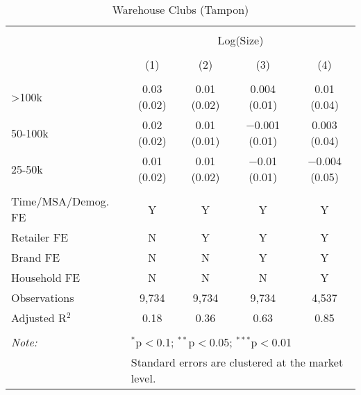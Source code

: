 
\begin{table}[!htbp] \centering 
  \caption{Warehouse Clubs (Tampon)} 
  \label{tab:packageSizeWarehouseTampon} 
\begin{tabular}{@{\extracolsep{5pt}}lcccc} 
\\[-1.8ex]\hline 
\hline \\[-1.8ex] 
 & \multicolumn{4}{c}{Log(Size)} \\ 
\\[-1.8ex] & (1) & (2) & (3) & (4)\\ 
\hline \\[-1.8ex] 
 >100k & 0.03 (0.02) & 0.01 (0.02) & 0.004 (0.01) & 0.01 (0.04) \\ 
  50-100k & 0.02 (0.02) & 0.01 (0.01) & $-$0.001 (0.01) & 0.003 (0.04) \\ 
  25-50k & 0.01 (0.02) & 0.01 (0.02) & $-$0.01 (0.01) & $-$0.004 (0.05) \\ 
 \hline \\[-1.8ex] 
Time/MSA/Demog. FE & Y & Y & Y & Y \\ 
Retailer FE & N & Y & Y & Y \\ 
Brand FE & N & N & Y & Y \\ 
Household FE & N & N & N & Y \\ 
Observations & 9,734 & 9,734 & 9,734 & 4,537 \\ 
Adjusted R$^{2}$ & 0.18 & 0.36 & 0.63 & 0.85 \\ 
\hline 
\hline \\[-1.8ex] 
\textit{Note:}  & \multicolumn{4}{l}{$^{*}$p$<$0.1; $^{**}$p$<$0.05; $^{***}$p$<$0.01} \\ 
 & \multicolumn{4}{l}{Standard errors are clustered at the market level.} \\ 
\end{tabular} 
\end{table} 
